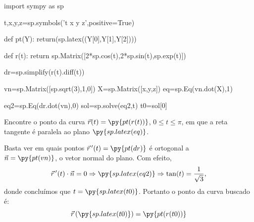 \documentclass[a4paper,addpoints,12pt]{exam}
\newcommand{\pyl}[1]{\py{sp.latex(#1)}}
\begin{document}
\begin{questions}
\begin{solution}
\end{solution}


\newpage

\begin{pycode}
import sympy as sp

t,x,y,z=sp.symbols('t x y z',positive=True)


def pt(Y):
 return(sp.latex((Y[0],Y[1],Y[2])))
 
def r(t):
	return sp.Matrix([2*sp.cos(t),2*sp.sin(t),sp.exp(t)])

dr=sp.simplify(r(t).diff(t))

vn=sp.Matrix([sp.sqrt(3),1,0])
X=sp.Matrix([x,y,z])
eq=sp.Eq(vn.dot(X),1)

eq2=sp.Eq(dr.dot(vn),0)
sol=sp.solve(eq2,t)
t0=sol[0]

\end{pycode}

\question[2] Encontre o ponto da curva $\vec{r}(t)=\py{pt(r(t))}$, $0\leq t\leq \pi$, em que a reta tangente é paralela ao plano $\pyl{eq}$.

\begin{solution}
Basta ver em quais pontos $\vec{r}\,^\prime(t)=\py{pt(dr)}$ é ortogonal a \\ $\vec{n}=\py{pt(vn)}$, o vetor normal do plano. Com efeito,
\[\vec{r}\,^\prime(t)\cdot \vec{n}=0\Rightarrow\pyl{eq2}\Rightarrow \tan(t)=\frac{1}{\sqrt{3}},\]
donde concluímos que $t=\pyl{t0}$. Portanto o ponto da curva buscado é:
\[\vec{r}\left(\pyl{t0}\right)=\py{pt(r(t0))}\]

\end{solution}

\end{questions}
\end{document}
